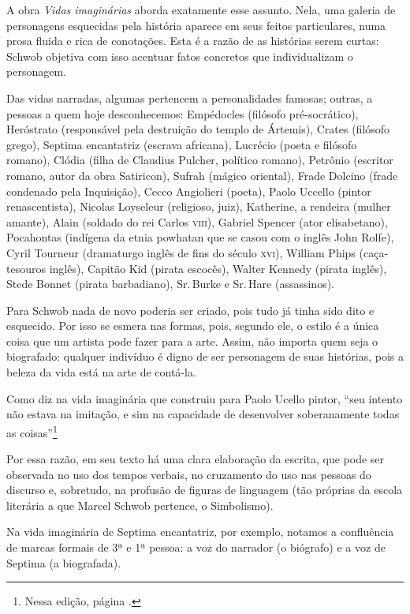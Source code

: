 A obra \textit{Vidas imaginárias} aborda exatamente esse assunto. Nela, uma
galeria de personagens esquecidas pela história aparece em seus feitos
particulares, numa prosa fluida e rica de conotações. Esta é a razão de
as histórias serem curtas: Schwob objetiva com isso acentuar fatos
concretos que individualizam o personagem.

Das vidas narradas, algumas pertencem a personalidades famosas; outras,
a pessoas a quem hoje desconhecemos: Empédocles (filósofo
pré-socrático), Heróstrato (responsável pela destruição do templo de
Ártemis), Crates (filósofo grego), Septima encantatriz (escrava
africana), Lucrécio (poeta e filósofo romano), Clódia (filha de Claudius
Pulcher, político romano), Petrônio (escritor romano, autor da obra
Satiricon), Sufrah (mágico oriental), Frade Dolcino (frade condenado
pela Inquisição), Cecco Angiolieri (poeta), Paolo Uccello (pintor
renascentista), Nicolas Loyseleur (religioso, juiz), Katherine, a
rendeira (mulher amante), Alain (soldado do rei Carlos \textsc{viii}), Gabriel
Spencer (ator elisabetano), Pocahontas (indígena da etnia powhatan que
se casou com o inglês John Rolfe), Cyril Tourneur (dramaturgo inglês de
fins do século \textsc{xvi}), William Phips (caça-tesouros inglês), Capitão Kid
(pirata escocês), Walter Kennedy (pirata inglês), Stede Bonnet (pirata
barbadiano), Sr.\,Burke e Sr.\,Hare (assassinos).

Para Schwob nada de novo poderia ser criado, pois tudo já tinha sido
dito e esquecido. Por isso se esmera nas formas, pois, segundo ele, o
estilo é a única coisa que um artista pode fazer para a arte. Assim, não
importa quem seja o biografado: qualquer indivíduo é digno de ser
personagem de suas histórias, pois a beleza da vida está na arte de
contá-la.

Como diz na vida imaginária que construiu para Paolo Ucello pintor,
``seu intento não estava na imitação, e sim na capacidade de desenvolver
soberanamente todas as coisas''\footnote{Nessa edição, página \pageref{intento}.}

Por essa razão, em seu texto há uma clara elaboração da escrita, que
pode ser observada no uso dos tempos verbais, no cruzamento do uso nas
pessoas do discurso e, sobretudo, na profusão de figuras de linguagem
(tão próprias da escola literária a que Marcel Schwob pertence, o
Simbolismo).

Na vida imaginária de Septima encantatriz, por exemplo, notamos a
confluência de marcas formais de 3ª e 1ª pessoa: a voz do narrador (o
biógrafo) e a voz de Septima (a biografada).

